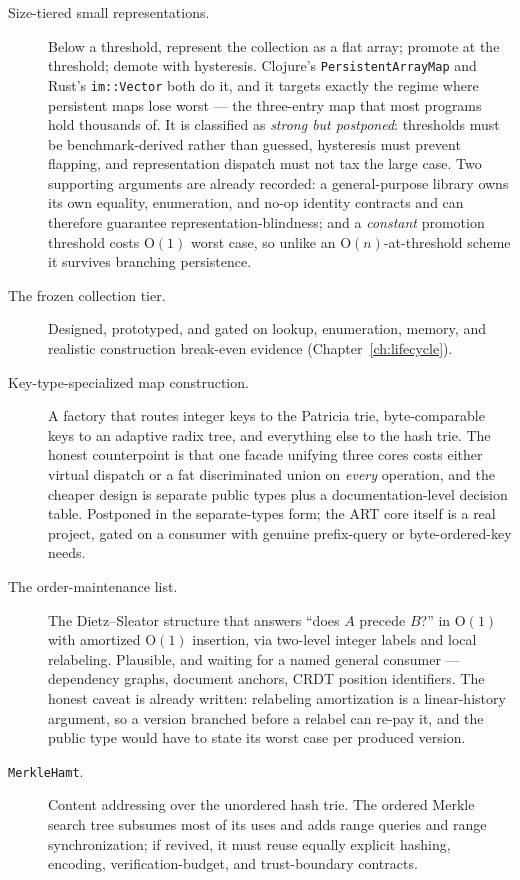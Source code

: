 \documentclass[11pt,twoside,openright]{book}
\newcommand{\code}[1]{\texorpdfstring{\textcolor{d7ink}{\texttt{#1}}}{#1}}
\newcommand{\bigoh}[1]{$\mathrm{O}(#1)$}
\begin{document}
\begin{description}
\item[Size-tiered small representations.] Below a threshold, represent the
collection as a flat array; promote at the threshold; demote with hysteresis.
Clojure's \code{PersistentArrayMap} and Rust's \code{im::Vector} both do it, and
it targets exactly the regime where persistent maps lose worst --- the
three-entry map that most programs hold thousands of. It is classified as
\emph{strong but postponed}: thresholds must be benchmark-derived rather than
guessed, hysteresis must prevent flapping, and representation dispatch must not
tax the large case. Two supporting arguments are already recorded: a
general-purpose library owns its own equality, enumeration, and no-op identity
contracts and can therefore guarantee representation-blindness; and a
\emph{constant} promotion threshold costs \bigoh{1} worst case, so unlike an
\bigoh{n}-at-threshold scheme it survives branching persistence.

\item[The frozen collection tier.] Designed, prototyped, and gated on lookup,
enumeration, memory, and realistic construction break-even evidence
(Chapter~\ref{ch:lifecycle}).

\item[Key-type-specialized map construction.] A factory that routes integer keys
to the Patricia trie, byte-comparable keys to an adaptive radix tree, and
everything else to the hash trie. The honest counterpoint is that one facade
unifying three cores costs either virtual dispatch or a fat discriminated union
on \emph{every} operation, and the cheaper design is separate public types plus a
documentation-level decision table. Postponed in the separate-types form; the ART
core itself is a real project, gated on a consumer with genuine prefix-query or
byte-ordered-key needs.

\item[The order-maintenance list.] The Dietz--Sleator structure that answers
``does $A$ precede $B$?'' in \bigoh{1} with amortized \bigoh{1} insertion, via
two-level integer labels and local relabeling. Plausible, and waiting for a
named general consumer --- dependency graphs, document anchors, CRDT position
identifiers. The honest caveat is already written: relabeling amortization is a
linear-history argument, so a version branched before a relabel can re-pay it,
and the public type would have to state its worst case per produced version.

\item[\code{MerkleHamt}.] Content addressing over the unordered hash trie. The
ordered Merkle search tree subsumes most of its uses and adds range queries and
range synchronization; if revived, it must reuse equally explicit hashing,
encoding, verification-budget, and trust-boundary contracts.
\end{description}
\end{document}
